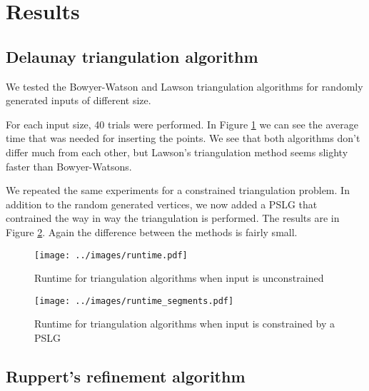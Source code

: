 \section{Results}
\label{sec:results}

\subsection{Delaunay triangulation algorithm}
\label{sub:results:triangulation}

We tested the Bowyer-Watson and Lawson triangulation algorithms for randomly generated inputs of different size.

For each input size, 40 trials were performed.
In Figure \ref{fig:triangulation-runtime} we can see the average time that was needed for inserting the points.
We see that both algorithms don't differ much from each other, but Lawson's triangulation method seems slighty faster than Bowyer-Watsons.


We repeated the same experiments for a constrained triangulation problem.
In addition to the random generated vertices, we now added a PSLG that contrained the way in way the triangulation is performed.
The results are in Figure \ref{fig:triangulation-pslg-runtime}.
Again the difference between the methods is fairly small.

\begin{figure}[ht]
    \centering
    \texttt{[image: ../images/runtime.pdf]}
    \label{fig:triangulation-runtime}
    \caption{Runtime for triangulation algorithms when input is unconstrained}
\end{figure}

\begin{figure}[ht]
    \centering
    \texttt{[image: ../images/runtime\_segments.pdf]}
    \caption{Runtime for triangulation algorithms when input is constrained by a PSLG}
    \label{fig:triangulation-pslg-runtime}
\end{figure}

\subsection{Ruppert's refinement algorithm}
\label{sub:results:ruppert}

